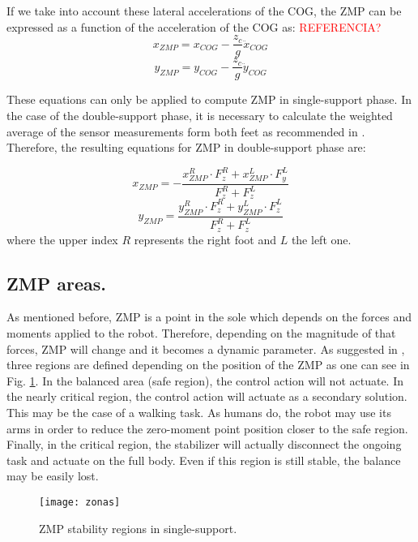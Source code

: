 If we take into account these lateral accelerations of the COG, the ZMP can be expressed as a function of the acceleration of the COG as: \textcolor{red}{REFERENCIA?}
\begin{equation}
x_{ZMP}=x_{COG}-\frac{z_c}{g}\ddot{x}_{COG}
\end{equation}
\begin{equation}
y_{ZMP}=y_{COG}-\frac{z_c}{g}\ddot{y}_{COG}
\end{equation}

These equations can only be applied to compute ZMP in single-support phase. In the case of the double-support phase, it is necessary to calculate the weighted average of the sensor measurements form both feet as recommended in \cite[pp. 82-83]{Kaj2005}. Therefore, the resulting equations for ZMP in double-support phase are:

\begin{equation}
x_{ZMP} = -\frac{x_{ZMP}^{R} \cdot F_{z}^{R} + x_{ZMP}^{L} \cdot F_{y}^{L}}{F_{z}^{R}+F_{z}^{L}}
\end{equation}
\begin{equation}
y_{ZMP} = \frac{y_{ZMP}^{R} \cdot F_{z}^{R} + y_{ZMP}^{L} \cdot F_{z}^{L}}{F_{z}^{R}+F_{z}^{L}}
\end{equation}
where the upper index $R$ represents the right foot and $L$ the left one.

\subsection{ZMP areas.}
As mentioned before, ZMP is a point in the sole which depends on the forces and moments applied to the robot. Therefore, depending on the magnitude of that forces, ZMP will change and it becomes a dynamic parameter. As suggested in \cite{Vuk2007}, three regions are defined depending on the position of the ZMP as one can see in Fig. \ref{fig:zonas}.
In the balanced area (safe region), the control action will not actuate. In the nearly critical region, the control action will actuate as a secondary solution. This may be the case of a walking task. As humans do, the robot may use its arms in order to reduce the zero-moment point position closer to the safe region. Finally, in the critical region, the stabilizer will actually disconnect the ongoing task and actuate on the full body. Even if this region is still stable, the balance may be easily lost. 


\begin{figure}[!hbt]
\centering
\texttt{[image: zonas]}
\caption{ZMP stability regions in single-support.}
\label{fig:zonas}
\end{figure}



